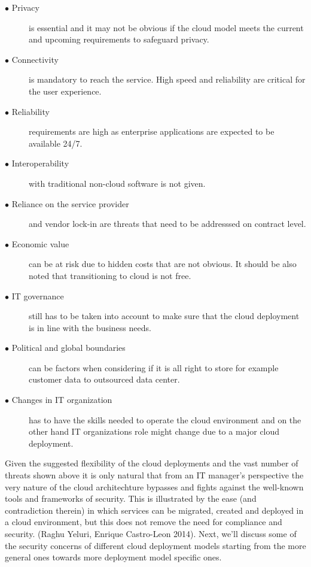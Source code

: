 \documentclass{article}
\begin{document}
\begin{description}
        \item[$\bullet$ Privacy] is essential and it may not be obvious if the cloud model meets the current and upcoming requirements to safeguard privacy.
        \item[$\bullet$ Connectivity] is mandatory to reach the service. High speed and reliability are critical for the user experience.
        \item[$\bullet$ Reliability] requirements are high as enterprise applications are expected to be available 24/7.
        \item[$\bullet$ Interoperability] with traditional non-cloud software is not given.
        \item[$\bullet$ Reliance on the service provider] and vendor lock-in are threats that need to be addresssed on contract level.
        \item[$\bullet$ Economic value] can be at risk due to hidden costs that are not obvious. It should be also noted that transitioning to cloud is not free.
        \item[$\bullet$ IT governance] still has to be taken into account to make sure that the cloud deployment is in line with the business needs.
        \item[$\bullet$ Political and global boundaries] can be factors when considering if it is all right to store for example customer data to outsourced data center.
        \item[$\bullet$ Changes in IT organization] has to have the skills needed to operate the cloud environment and on the other hand IT organizations role might change due to a major cloud deployment.
\end{description}
Given the suggested flexibility of the cloud deployments and the vast number of threats shown above it is only natural that from an IT manager's perspective the very nature of the cloud architechture bypasses and fights against the well-known tools and frameworks of security.
This is illustrated by the ease (and contradiction therein) in which services can be migrated, created and deployed in a cloud environment, but this does not remove the need for compliance and security. (Raghu Yeluri, Enrique Castro-Leon 2014). 
Next, we'll discuss some of the security concerns of different cloud deployment models starting from the more general ones towards more deployment model specific ones.
\end{document}
